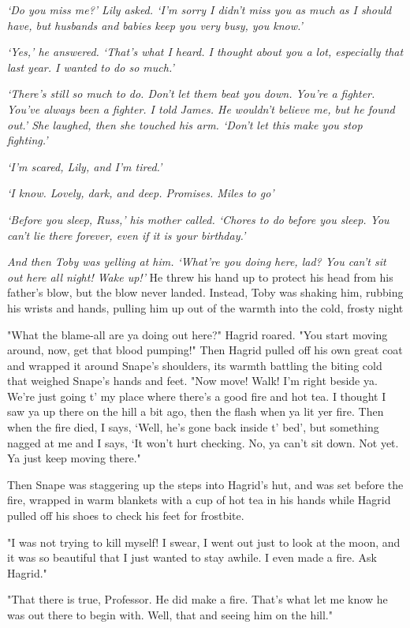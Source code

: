 \emph{`Do you miss me?' Lily asked. `I'm sorry I didn't miss you as much as I should have, but husbands and babies keep you very busy, you know.'}

\emph{`Yes,' he answered. `That's what I heard. I thought about you a lot, especially that last year. I wanted to do so much.'}

\emph{`There's still so much to do. Don't let them beat you down. You're a fighter. You've always been a fighter. I told James. He wouldn't believe me, but he found out.' She laughed, then she touched his arm. `Don't let this make you stop fighting.'}

\emph{`I'm scared, Lily, and I'm tired.'}

\emph{`I know. Lovely, dark, and deep. Promises. Miles to go{\el}'}

\emph{`Before you sleep, Russ,' his mother called. `Chores to do before you sleep. You can't lie there forever, even if it is your birthday.'}

\emph{And then Toby was yelling at him. `What're you doing here, lad? You can't sit out here all night! Wake up!'} He threw his hand up to protect his head from his father's blow, but the blow never landed. Instead, Toby was shaking him, rubbing his wrists and hands, pulling him up out of the warmth into the cold, frosty night{\el}

"What the blame-all are ya doing out here?" Hagrid roared. "You start moving around, now, get that blood pumping!" Then Hagrid pulled off his own great coat and wrapped it around Snape's shoulders, its warmth battling the biting cold that weighed Snape's hands and feet. "Now move! Walk! I'm right beside ya. We're just going t' my place where there's a good fire and hot tea. I thought I saw ya up there on the hill a bit ago, then the flash when ya lit yer fire. Then when the fire died, I says, `Well, he's gone back inside t' bed', but something nagged at me and I says, `It won't hurt checking. No, ya can't sit down. Not yet. Ya just keep moving there."

Then Snape was staggering up the steps into Hagrid's hut, and was set before the fire, wrapped in warm blankets with a cup of hot tea in his hands while Hagrid pulled off his shoes to check his feet for frostbite.

"I was not trying to kill myself! I swear, I went out just to look at the moon, and it was so{\el} beautiful{\el} that I just wanted to stay awhile. I even made a fire. Ask Hagrid."

"That there is true, Professor. He did make a fire. That's what let me know he was out there to begin with. Well, that and seeing him on the hill."

